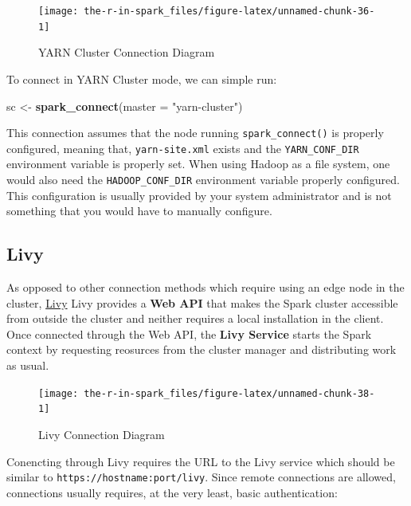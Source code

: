 \documentclass[]{book}
\newenvironment{Shaded}{\begin{snugshade}}{\end{snugshade}}
\newcommand{\DataTypeTok}[1]{\textcolor[rgb]{0.13,0.29,0.53}{#1}}
\newcommand{\KeywordTok}[1]{\textcolor[rgb]{0.13,0.29,0.53}{\textbf{#1}}}
\newcommand{\NormalTok}[1]{#1}
\newcommand{\StringTok}[1]{\textcolor[rgb]{0.31,0.60,0.02}{#1}}
\theoremstyle{definition}
\theoremstyle{definition}
\theoremstyle{definition}
\theoremstyle{remark}
\begin{document}
\begin{figure}

{\centering \texttt{[image: the-r-in-spark\_files/figure-latex/unnamed-chunk-36-1]} 

}

\caption{YARN Cluster Connection Diagram}\label{fig:unnamed-chunk-36}
\end{figure}

To connect in YARN Cluster mode, we can simple run:

\begin{Shaded}
\begin{Highlighting}[]
\NormalTok{sc <-}\StringTok{ }\KeywordTok{spark_connect}\NormalTok{(}\DataTypeTok{master =} \StringTok{"yarn-cluster"}\NormalTok{)}
\end{Highlighting}
\end{Shaded}

This connection assumes that the node running \texttt{spark\_connect()}
is properly configured, meaning that, \texttt{yarn-site.xml} exists and
the \texttt{YARN\_CONF\_DIR} environment variable is properly set. When
using Hadoop as a file system, one would also need the
\texttt{HADOOP\_CONF\_DIR} environment variable properly configured.
This configuration is usually provided by your system administrator and
is not something that you would have to manually configure.

\hypertarget{livy}{%
\subsection{Livy}\label{livy}}

As opposed to other connection methods which require using an edge node
in the cluster, \href{clusters-livy}{Livy} Livy provides a \textbf{Web
API} that makes the Spark cluster accessible from outside the cluster
and neither requires a local installation in the client. Once connected
through the Web API, the \textbf{Livy Service} starts the Spark context
by requesting reosurces from the cluster manager and distributing work
as usual.

\begin{figure}

{\centering \texttt{[image: the-r-in-spark\_files/figure-latex/unnamed-chunk-38-1]} 

}

\caption{Livy Connection Diagram}\label{fig:unnamed-chunk-38}
\end{figure}

Conencting through Livy requires the URL to the Livy service which
should be similar to \texttt{https://hostname:port/livy}. Since remote
connections are allowed, connections usually requires, at the very
least, basic authentication:
\end{document}
